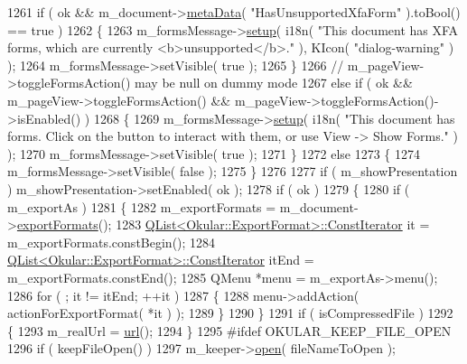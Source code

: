\begin{DoxyCode}
1261     \textcolor{keywordflow}{if} ( ok && m\_document->\hyperlink{classOkular_1_1Document_a44c7c367dbe37fffeeb3d08171ff9ab6}{metaData}( \textcolor{stringliteral}{"HasUnsupportedXfaForm"} ).toBool() == true )
1262     \{
1263         m\_formsMessage->\hyperlink{classPageViewTopMessage_a1027efb398d2d35a82846c0c92e4d257}{setup}( i18n( \textcolor{stringliteral}{"This document has XFA forms, which are currently
       <b>unsupported</b>."} ), KIcon( \textcolor{stringliteral}{"dialog-warning"} ) );
1264         m\_formsMessage->setVisible( \textcolor{keyword}{true} );
1265     \}
1266     \textcolor{comment}{// m\_pageView->toggleFormsAction() may be null on dummy mode}
1267     \textcolor{keywordflow}{else} \textcolor{keywordflow}{if} ( ok && m\_pageView->toggleFormsAction() && m\_pageView->toggleFormsAction()->isEnabled() )
1268     \{
1269         m\_formsMessage->\hyperlink{classPageViewTopMessage_a1027efb398d2d35a82846c0c92e4d257}{setup}( i18n( \textcolor{stringliteral}{"This document has forms. Click on the button to interact with
       them, or use View -> Show Forms."} ) );
1270         m\_formsMessage->setVisible( \textcolor{keyword}{true} );
1271     \}
1272     \textcolor{keywordflow}{else}
1273     \{
1274         m\_formsMessage->setVisible( \textcolor{keyword}{false} );
1275     \}
1276 
1277     \textcolor{keywordflow}{if} ( m\_showPresentation ) m\_showPresentation->setEnabled( ok );
1278     \textcolor{keywordflow}{if} ( ok )
1279     \{
1280         \textcolor{keywordflow}{if} ( m\_exportAs )
1281         \{
1282             m\_exportFormats = m\_document->\hyperlink{classOkular_1_1Document_acd6e2014d6198fa7411ae02a138eccb7}{exportFormats}();
1283             \hyperlink{classQList}{QList<Okular::ExportFormat>::ConstIterator} it = 
      m\_exportFormats.constBegin();
1284             \hyperlink{classQList}{QList<Okular::ExportFormat>::ConstIterator} itEnd = 
      m\_exportFormats.constEnd();
1285             QMenu *menu = m\_exportAs->menu();
1286             \textcolor{keywordflow}{for} ( ; it != itEnd; ++it )
1287             \{
1288                 menu->addAction( actionForExportFormat( *it ) );
1289             \}
1290         \}
1291         \textcolor{keywordflow}{if} ( isCompressedFile )
1292         \{
1293             m\_realUrl = \hyperlink{classKParts_1_1ReadOnlyPart_aba05c3b2fd42dcfebc6585e4f746d2cb}{url}();
1294         \}
1295 \textcolor{preprocessor}{#ifdef OKULAR\_KEEP\_FILE\_OPEN}
1296         \textcolor{keywordflow}{if} ( keepFileOpen() )
1297             m\_keeper->\hyperlink{classFileKeeper_a9f45113678bcac6c86626303a1e26473}{open}( fileNameToOpen );

\end{DoxyCode}
